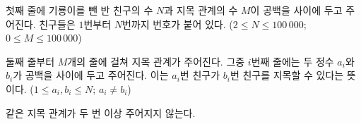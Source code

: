 첫째 줄에 기룡이를 뺀 반 친구의 수 $N$과 지목 관계의 수 $M$이 공백을 사이에 두고 주어진다. 
친구들은 $1$번부터 $N$번까지 번호가 붙어 있다. ($2 \le N \le 100\,000$; $0 \le M \le 100\,000$)

둘째 줄부터 $M$개의 줄에 걸쳐 지목 관계가 주어진다. 
그중 $i$번째 줄에는 두 정수 $a_i$와 $b_i$가 공백을 사이에 두고 주어진다. 
이는 $a_i$번 친구가 $b_i$번 친구를 지목할 수 있다는 뜻이다. ($1 \le a_i,b_i \le N$; $a_i \ne b_i$)

같은 지목 관계가 두 번 이상 주어지지 않는다.